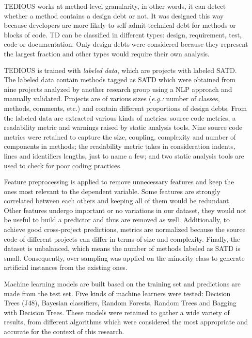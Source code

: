 \ac{TEDIOUS} works at method-level granularity, in other words, it can detect whether a method contains a design debt or not. It was designed this way because developers are more likely to self-admit technical debt for methods or blocks of code. \ac{TD} can be classified in different types: design, requirement, test, code or documentation. Only design debts were considered because they represent the largest fraction and other types would require their own analysis.  \par

\ac{TEDIOUS} is trained with \emph{labeled data}, which are projects with labeled \ac{SATD}. The labeled data contain methods tagged as \ac{SATD} which were obtained from nine projects analyzed by another research group using a \ac{NLP} approach and manually validated. Projects are of various sizes (\emph{e.g.:} number of classes, methods, comments, etc.) and contain different proportions of design debts. From the labeled data are extracted various kinds of metrics: source code metrics, a readability metric and warnings raised by static analysis tools. Nine source code metrics were retained to capture the size, coupling, complexity and number of components in methods; the readability metric takes in consideration indents, lines and identifiers lengths, just to name a few; and two static analysis tools are used to check for poor coding practices. \par

Feature preprocessing is applied to remove unnecessary features and keep the ones most relevant to the dependent variable. Some features are strongly correlated between each others and keeping all of them would be redundant. Other features undergo important or no variations in our dataset, they would not be useful to build a predictor and thus are removed as well. Additionally, to achieve good cross-project predictions, metrics are normalized because the source code of different projects can differ in terms of size and complexity. Finally, the dataset is unbalanced, which means the number of methods labeled as \ac{SATD} is small. Consequently, over-sampling was applied on the minority class to generate artificial instances from the existing ones. \par

Machine learning models are built based on the training set and predictions are made from the test set. Five kinds of machine learners were tested: Decision Trees (J48), Bayesian classifiers, Random Forests, Random Trees and Bagging with Decision Trees. These models were retained to gather a wide variety of results, from different algorithms which were considered the most appropriate and accurate for the context of this research. \par

